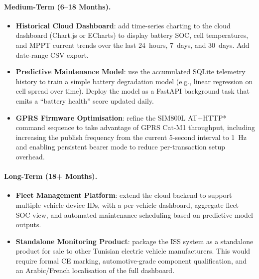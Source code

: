 \paragraph{Medium-Term (6--18 Months).}
\begin{itemize}
    \item \textbf{Historical Cloud Dashboard}: add time-series charting to the cloud dashboard (Chart.js or ECharts) to display battery SOC, cell temperatures, and MPPT current trends over the last 24~hours, 7~days, and 30~days. Add date-range CSV export.
    \item \textbf{Predictive Maintenance Model}: use the accumulated SQLite telemetry history to train a simple battery degradation model (e.g., linear regression on cell spread over time). Deploy the model as a FastAPI background task that emits a ``battery health'' score updated daily.
    \item \textbf{GPRS Firmware Optimisation}: refine the SIM800L AT+HTTP* command sequence to take advantage of GPRS Cat-M1 throughput, including increasing the publish frequency from the current 5-second interval to 1~Hz and enabling persistent bearer mode to reduce per-transaction setup overhead.
\end{itemize}

\paragraph{Long-Term (18+ Months).}
\begin{itemize}
    \item \textbf{Fleet Management Platform}: extend the cloud backend to support multiple vehicle device IDs, with a per-vehicle dashboard, aggregate fleet SOC view, and automated maintenance scheduling based on predictive model outputs.
    \item \textbf{Standalone Monitoring Product}: package the ISS system as a standalone product for sale to other Tunisian electric vehicle manufacturers. This would require formal CE marking, automotive-grade component qualification, and an Arabic/French localisation of the full dashboard.
\end{itemize}
